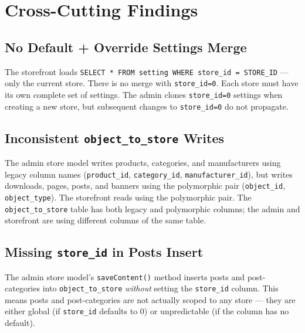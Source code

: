 \documentclass[11pt,a4paper]{article}
\begin{document}
\section{Cross-Cutting Findings}\label{sec:findings}

\subsection{No Default + Override Settings Merge}

\begin{findingbox}
The storefront loads \texttt{SELECT * FROM setting WHERE store\_id =
STORE\_ID} --- only the current store. There is no merge with
\texttt{store\_id=0}. Each store must have its own complete set of
settings. The admin clones \texttt{store\_id=0} settings when creating
a new store, but subsequent changes to \texttt{store\_id=0} do not
propagate.
\end{findingbox}

\subsection{Inconsistent \texttt{object\_to\_store} Writes}

\begin{findingbox}
The admin store model writes products, categories, and manufacturers
using legacy column names (\texttt{product\_id}, \texttt{category\_id},
\texttt{manufacturer\_id}), but writes downloads, pages, posts, and
banners using the polymorphic pair (\texttt{object\_id},
\texttt{object\_type}). The storefront reads using the polymorphic
pair. The \texttt{object\_to\_store} table has both legacy and
polymorphic columns; the admin and storefront are using different
columns of the same table.
\end{findingbox}

\subsection{Missing \texttt{store\_id} in Posts Insert}

\begin{findingbox}
The admin store model's \texttt{saveContent()} method inserts posts
and post-categories into \texttt{object\_to\_store} \emph{without}
setting the \texttt{store\_id} column. This means posts and
post-categories are not actually scoped to any store --- they are
either global (if \texttt{store\_id} defaults to 0) or
unpredictable (if the column has no default).
\end{findingbox}
\end{document}
